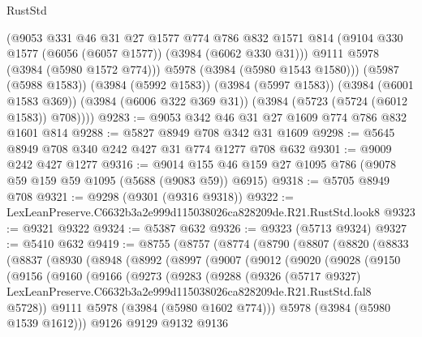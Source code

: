 \begin{lexlean}{RustStd}
\begin{coremodule}
          (@9053
            @331
            @46
            @31
            @27
            @1577
            @774
            @786
            @832
            @1571
            @814
            (@9104 @330 @1577 (@6056 (@6057 @1577)) (@3984 (@6062 @330 @31)))
            @9111
            @5978
            (@3984 (@5980 @1572 @774)))
          @5978
          (@3984 (@5980 @1543 @1580)))
        (@5987 (@5988 @1583))
        (@3984 (@5992 @1583))
        (@3984 (@5997 @1583))
        (@3984 (@6001 @1583 @369))
        (@3984 (@6006 @322 @369 @31))
        (@3984 (@5723 (@5724 (@6012 @1583)) @708))))
@9283 := @9053 @342 @46 @31 @27 @1609 @774 @786 @832 @1601 @814
@9288 := @5827 @8949 @708 @342 @31 @1609
@9298 := @5645 @8949 @708 @340 @242 @427 @31 @774 @1277 @708 @632
@9301 := @9009 @242 @427 @1277
@9316 := @9014 @155 @46 @159 @27 @1095 @786 (@9078 @59 @159 @59 @1095 (@5688 (@9083 @59)) @6915)
@9318 := @5705 @8949 @708
@9321 := @9298 (@9301 (@9316 @9318))
@9322 := LexLeanPreserve.C6632b3a2e999d115038026ca828209de.R21.RustStd.look8
@9323 := @9321 @9322
@9324 := @5387 @632
@9326 := @9323 (@5713 @9324)
@9327 := @5410 @632
@9419 := @8755
    (@8757
      (@8774
        (@8790
          (@8807
            (@8820
              (@8833
                (@8837
                  (@8930
                    (@8948
                      (@8992
                        (@8997
                          (@9007
                            (@9012
                              (@9020
                                (@9028
                                  (@9150
                                    (@9156
                                      (@9160
                                        (@9166
                                          (@9273
                                            (@9283
                                              (@9288
                                                (@9326
                                                  (@5717 @9327)
                                                  LexLeanPreserve.C6632b3a2e999d115038026ca828209de.R21.RustStd.fal8
                                                  @5728))
                                              @9111
                                              @5978
                                              (@3984 (@5980 @1602 @774)))
                                            @5978
                                            (@3984 (@5980 @1539 @1612)))
                                          @9126
                                          @9129
                                          @9132
                                          @9136

\end{coremodule}
\end{lexlean}
